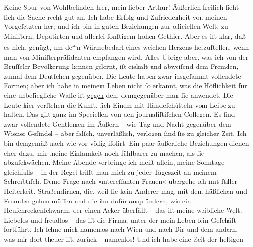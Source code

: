 \pstart
           Keine Spur von Wohlbefinden hier, mein lieber Arthur! Äußerlich freilich ſieht ſich
               die Sache recht gut an. Ich habe Erfolg und Zufriedenheit von meinen Vorgeſetzten
               her; und ich bin in guten Beziehungen zur officiellen Welt, zu Miniſtern, Deputirten
               und allerlei ſonſtigem hohen Gethier. Aber es iſt klar, daß \strikeout{\textcolor{gray}{d}} es nicht genügt, um de\substVorne{}\textsuperscript{m}\substDazwischen{}n\substHinten{} Wärmebedarf eines weichen Herzens herzuſtellen, wenn man von
               Miniſterpräſidenten empfangen wird. Alles Übrige aber, was ich von der Brüſſeler Bevölkerung kennen gelernt, iſt eiskalt
               und abweiſend dem Fremden, zumal dem Deutſchen gegenüber. Die Leute haben zwar  insgeſammt vollendete Formen; aber ich habe in
               meinem Leben nicht ſo erkannt, was die Höflichkeit für eine unbeſiegliche {\pb}Waffe iſt \uline{gegen} den,
               demgegenüber man ſie anwendet. Die Leute hier verſtehen die Kunſt, ſich Einem mit
               Händeſchütteln vom  Leibe zu halten. Das gilt
               ganz im Speciellen von den journaliſtiſchen Collegen. Es ſind zwar vollendete
               Gentlemen im Äußern – wie Tag und Nacht gegenüber dem Wiener Geſindel – aber falſch, unverläßlich, verlogen ſind ſie zu gleicher
               Zeit. Ich bin demgemäß nach wie vor völlig iſolirt. Ein paar äußerliche Beziehungen
               dienen eher dazu, mir meine Einſamkeit noch fühlbarer zu machen, als ſie
               abzuſchwächen. Meine Abende verbringe ich meiſt allein, meine Sonntage gleichfalls –
               in der Regel trifft man mich zu jeder Tageszeit an meinem Schreibtiſch. Deine Frage
               nach »intereſſanten Frauen« übergehe ich mit ſtiller Heiterkeit. Straßendirnen, die,
               weil ſie kein Anderer mag, mit dem häßlichen und \label{K_L02668-4v}\label{K_L02668-4} Fremden gehen müſſen und die ihn dafür ausplündern, wie ein
               Heuſchreckenſchwarm, der einen Acker überfällt – das iſt meine {\pb}weibliche Welt. Liebelos und freudlos – das iſt die
               Firma, unter der mein Leben ſein Geſchäft fortführt. Ich ſehne mich namenlos nach Wien und nach Dir und dem andern, was mir dort
               theuer iſt, zurück – namenlos! Und ich habe eine \textcolor{gray}{Z}eit der heftigen
